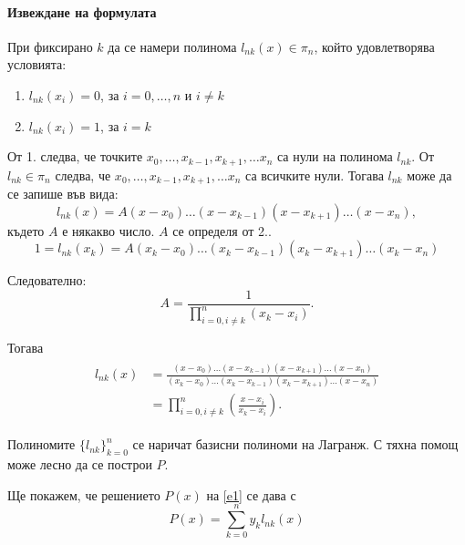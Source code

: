 \documentclass[12pt]{article}
\numberwithin{equation}{subsection}
\numberwithin{theorem}{subsection}
\numberwithin{definition}{subsection}
\numberwithin{corollary}{subsection}
\begin{document}
  \paragraph{Извеждане на формулата\\}
  При фиксирано $k$ да се намери полинома $l_{nk}(x)\in \pi_n$, който удовлетворява условията:
  \begin{enumerate}
      \item $l_{nk}(x_i) = 0$, за $i = 0, \dotso, n$ и $i \neq k$
      \item $l_{nk}(x_i) = 1$, за $i = k$
  \end{enumerate} 
  От 1. следва, че точките $x_0, \dotso, x_{k-1}, x_{k+1}, \dotso x_n$ са нули на полинома $l_{nk}$. От $l_{nk} \in \pi_n$ следва, че $x_0, \dotso, x_{k-1}, x_{k+1}, \dotso x_n$ са всичките нули. Тогава $l_{nk}$ може да се запише във вида:
  \begin{equation*}
  l_{nk}(x) = A(x - x_0)\dotso(x - x_{k-1})(x - x_{k+1})\dotso(x-x_n),
  \end{equation*}
  където $A$ е някакво число. $A$ се определя от 2..
  \begin{equation*}
  1 = l_{nk}(x_k) = A(x_k - x_0)\dotso(x_k - x_{k-1})(x_k - x_{k+1})\dotso(x_k - x_n)
  \end{equation*}
  \par
  Следователно:
  \begin{equation*}
  A = \frac{1}{\displaystyle \prod_{i=0,i\neq k}^{n}(x_k-x_i)}.
  \end{equation*}
  \par
  Тогава
  \begin{align}\label{e2}
  \begin{split}
  l_{nk}(x) &= \frac{(x - x_0)\dotso(x - x_{k-1})(x - x_{k+1})\dotso (x - x_n)}
  {(x_k - x_0)\dotso(x_k - x_{k-1})(x_k - x_{k+1})\dotso(x - x_n)}\\ &= 
  \displaystyle \prod_{i = 0, i \neq k}^n\left(\frac{x-x_i}{x_k - x_i}\right).
  \end{split}
  \end{align}
  \par
  Полиномите $\{l_{nk}\}_{k = 0}^n$ се наричат базисни полиноми на Лагранж. С тяхна помощ може лесно да се построи $P$.
  \par
  Ще покажем, че решението $P(x)$ на \ref{e1} се дава с 
  \begin{equation}\label{e3}
  P(x) = \displaystyle\sum_{k = 0}^ny_kl_{nk}(x)
  \end{equation}
  \par
\end{document}
